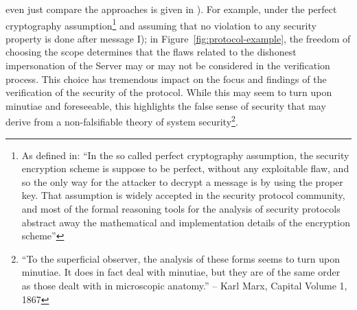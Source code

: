 even just compare the approaches is given in \autocite{Cremers2009comparing}). For
example, under the perfect cryptography assumption\footnote{As defined
in\autocite{Rocchetto2016cpdy}: ``In the so called perfect cryptography
assumption, the security encryption scheme is suppose to be perfect, without
any exploitable flaw, and so the only way for the attacker to decrypt a message
is by using the proper key. That assumption is widely accepted in the security
protocol community, and most of the formal reasoning tools for the analysis of
security protocols abstract away the mathematical and implementation details of
the encryption
scheme\autocite{Turuani2006clatse,Basin2005ofmc,Armando2016satmc,Rocchetto2017interpolation}''}
and assuming that no violation to any security property is done after message
I); in Figure~\ref{fig:protocol-example}, the freedom of choosing the scope
determines that the flaws related to the dishonest impersonation of the Server
may or may not be considered in the verification process.  This choice has
tremendous impact on the focus and findings of the verification of the security
of the protocol.  While this may seem to turn upon minutiae and foreseeable,
this highlights the false sense of security that may derive from a
non-falsifiable theory of system security\footnote{``To the superficial
observer, the analysis of these forms seems to turn upon minutiae. It does in
fact deal with minutiae, but they are of the same order as those dealt with in
microscopic anatomy.'' -- Karl Marx, Capital Volume 1, 1867}.

